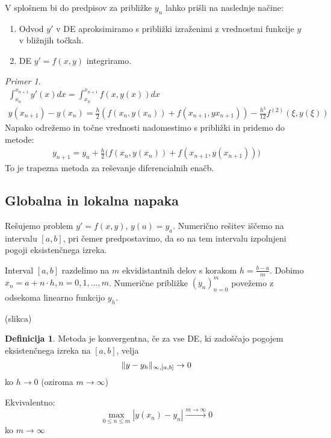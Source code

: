 \documentclass[a4paper,12pt]{article}
\DeclarePairedDelimiter\norm{\lVert}{\rVert}
\theoremstyle{definition}
\newtheorem{defn}[counter]{Definicija}
\theoremstyle{remark}
\newtheorem*{ex}{Primer}
\begin{document}
V splošnem bi do predpisov za približke $y_n$ lahko prišli na naslednje načine:

\begin{enumerate}
    \item Odvod $y'$ v DE aproksimiramo s približki izraženimi z vrednostmi funkcije $y$ v bližnjih točkah.
    \item DE $y' = f(x, y)$ integriramo.
\end{enumerate}


\begin{ex}
    \begin{gather*}
        \int_{x_n}^{x_{n+1}} y'(x) dx = \int_{x_n}^{x_{n+1}} f(x, y(x)) dx \\
        y(x_{n+1}) - y(x_n) = \frac{h}{2} (f(x_n, y(x_n)) + f(x_{n+1}, yx_{n+1})) - \frac{h^3}{12} f^{(2)}(\xi, y(\xi))
    \end{gather*}
    Napako odrežemo in točne vrednosti nadomestimo s približki in pridemo do metode:
    \begin{gather*}
        y_{n+1} = y_n + \frac{h}{2} \big(f(x_n, y(x_n)) + f(x_{n+1}, y(x_{n+1}))\big)
    \end{gather*}
    To je trapezna metoda za reševanje diferencialnih enačb.
\end{ex}


\subsection{Globalna in lokalna napaka}

Rešujemo problem $y' = f(x, y)$, $y(a) = y_a$. Numerično rešitev iščemo na intervalu $[a, b]$, pri čemer predpostavimo, 
da so na tem intervalu izpolnjeni pogoji eksistenčnega izreka.

Interval $[a, b]$ razdelimo na $m$ ekvidistantnih delov s korakom $h = \frac{b-a}{m}$. Dobimo $x_n = a + n \cdot h, n = 0, 1, \dots, m$.
Numerične približke $(y_n)_{n=0}^m$ povežemo z odsekoma linearno funkcijo $y_h$.

(slikca)

\begin{defn}
    Metoda je konvergentna, če za vse DE, ki zadoščajo pogojem eksistenčnega izreka na $[a, b]$, velja
    \begin{equation*}
        \norm{y-y_h}_{\infty, [a, b]} \to 0
    \end{equation*}
    ko $h \to 0$ (oziroma $m \to \infty$)
    
    Ekvivalentno:
    \begin{equation*}
        \max_{0 \leq n \leq m} |y(x_n) - y_n| \xrightarrow{m \to \infty} 0
    \end{equation*}
    ko $m \to \infty$
\end{defn}
\end{document}
